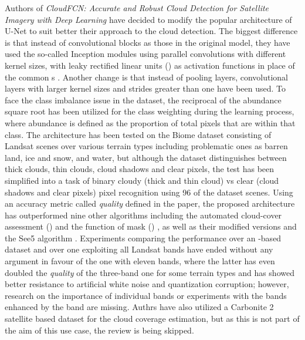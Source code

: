 Authors of \textit{CloudFCN: Accurate and Robust Cloud Detection for Satellite Imagery with Deep Learning} have decided to modify the popular architecture of U-Net \cite{u-net} to suit better their approach to the cloud detection. The biggest difference is that instead of convolutional blocks as those in the original model, they have used the so-called Inception modules \cite{inception} using parallel convolutions with different kernel sizes, with leaky rectified linear units () \cite{leaky-relu} as activation functions in place of the common s \cite{relu}. Another change is that instead of pooling layers, convolutional layers with larger kernel sizes and strides greater than one have been used. To face the class imbalance issue in the dataset, the reciprocal of the abundance square root has been utilized for the class weighting during the learning process, where abundance is defined as the proportion of total pixels that are within that class. The architecture has been tested on the Biome dataset \cite{biome} consisting of Landsat scenes over various terrain types including problematic ones as barren land, ice and snow, and water, but although the dataset distinguishes between thick clouds, thin clouds, cloud shadows and clear pixels, the test has been simplified into a task of binary cloudy (thick and thin cloud) vs clear (cloud shadows and clear pixels) pixel recognition using 96 of the dataset scenes. Using an accuracy metric called \textit{quality} defined in the paper, the proposed architecture has outperformed nine other algorithms including the automated cloud-cover assessment () \cite{acca} and the function of mask () \cite{fmask}, as well as their modified versions and the See5 algorithm \cite{biome}. Experiments comparing the performance over an -based dataset and over one exploiting all Landsat bands have ended without any argument in favour of the one with eleven bands, where the latter has even doubled the \textit{quality} of the three-band one for some terrain types and has showed better resistance to artificial white noise and quantization corruption; however, research on the importance of individual bands or experiments with the  bands enhanced by the  band are missing. Authrs have also utilized a Carbonite 2 satellite based dataset for the cloud coverage estimation, but as this is not part of the aim of this use case, the review is being skipped.

